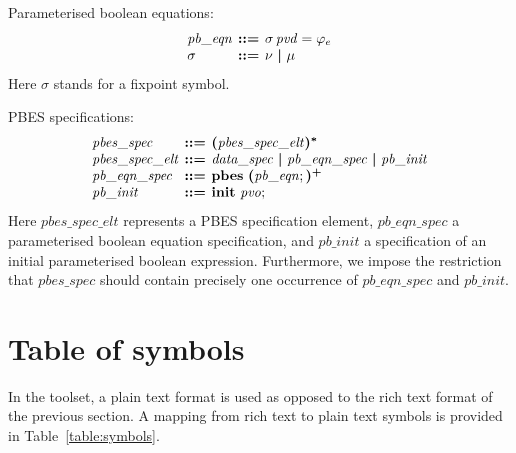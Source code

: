 \documentclass[a4paper,fleqn,10pt]{article}
\makeatletter
\newcommand{\f}[1]{\ensuremath{\mathit{#1}}}
\newenvironment{tightarray}[1]
  {\setlength{\arraycolsep}{2pt}%
   \begin{array}{@{}#1@{}}%
  }
  {\end{array}%
  }
\newcommand{\mb}[1]{\text{\boldmath$#1$}}
\newcommand{\kwinit}{{\bf init}}
\newcommand{\kwpbes}{{\bf pbes}}
\makeatother
\begin{document}
Parameterised boolean equations:
\[\begin{tightarray}{lrl}
\f{pb\_eqn} & \mb{::=} & \sigma\,\f{pvd} = \varphi_e\\
\sigma      & \mb{::=} & \nu\ \mb{|}\ \mu
\end{tightarray}\]
Here $\sigma$ stands for a fixpoint symbol.

PBES specifications:
\[\begin{tightarray}{lrl}
\f{pbes\_spec}      & \mb{::=} & \mb{(}\f{pbes\_spec\_elt}\mb{)^{*}}\\
\f{pbes\_spec\_elt} & \mb{::=} & \f{data\_spec}\ \mb{|}\ \f{pb\_eqn\_spec}\ \mb{|}\ \f{pb\_init}\\
\f{pb\_eqn\_spec}   & \mb{::=} & \kwpbes\ \mb{(}\f{pb\_eqn};\mb{)^{+}}\\
\f{pb\_init}        & \mb{::=} & \kwinit\ \f{pvo};
\end{tightarray}\]
Here $\f{pbes\_spec\_elt}$ represents a PBES specification element, $\f{pb\_eqn\_spec}$ a parameterised boolean equation specification, and $\f{pb\_init}$ a specification of an initial parameterised boolean expression. Furthermore, we impose the restriction that $\f{pbes\_spec}$ should contain precisely one occurrence of $\f{pb\_eqn\_spec}$ and $\f{pb\_init}$.

\newpage

\section{Table of symbols}
\label{sec:symbols}

In the toolset, a plain text format is used as opposed to the rich text format of the previous section.
A mapping from rich text to plain text symbols is provided in Table~\ref{table:symbols}.
\end{document}
